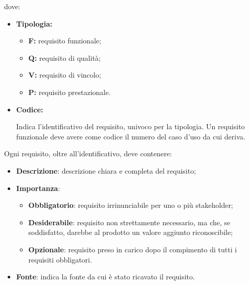 dove:
\begin{itemize}
    \item \textbf{Tipologia:}
          \begin{itemize}
              \item \textbf{F:} requisito funzionale;
              \item \textbf{Q:} requisito di qualità;
              \item \textbf{V:} requisito di vincolo;
              \item \textbf{P:} requisito prestazionale.
          \end{itemize}
    \item \textbf{Codice:}
          \par Indica l'identificativo del requisito, univoco per la tipologia. Un
          requisito funzionale deve avere come codice il numero del caso d'uso da cui
          deriva.
\end{itemize}
Ogni requisito, oltre all'identificativo, deve contenere:
\begin{itemize}
    \item \textbf{Descrizione}: descrizione chiara e completa del requisito;
    \item \textbf{Importanza}:
          \begin{itemize}
              \item \textbf{Obbligatorio}: requisito irrinunciabile per uno o più stakeholder;
              \item \textbf{Desiderabile}: requisito non strettamente necessario, ma che, se soddisfatto, darebbe al prodotto un valore aggiunto riconoscibile;
              \item \textbf{Opzionale}: requisito preso in carico dopo il compimento di tutti i requisiti obbligatori.
          \end{itemize}
    \item \textbf{Fonte}: indica la fonte da cui è stato ricavato il requisito.
\end{itemize}

